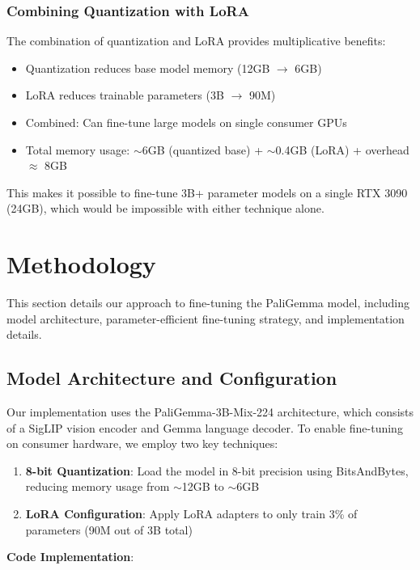 \documentclass[conference]{IEEEtran}
\begin{document}
\subsubsection{Combining Quantization with LoRA}

The combination of quantization and LoRA provides multiplicative benefits:

\begin{itemize}
    \item Quantization reduces base model memory (12GB $\rightarrow$ 6GB)
    \item LoRA reduces trainable parameters (3B $\rightarrow$ 90M)
    \item Combined: Can fine-tune large models on single consumer GPUs
    \item Total memory usage: $\sim$6GB (quantized base) + $\sim$0.4GB (LoRA) + overhead $\approx$ 8GB
\end{itemize}

This makes it possible to fine-tune 3B+ parameter models on a single RTX 3090 (24GB), which would be impossible with either technique alone.

\section{Methodology}

This section details our approach to fine-tuning the PaliGemma model, including model architecture, parameter-efficient fine-tuning strategy, and implementation details.

\subsection{Model Architecture and Configuration}

Our implementation uses the PaliGemma-3B-Mix-224 architecture, which consists of a SigLIP vision encoder and Gemma language decoder. To enable fine-tuning on consumer hardware, we employ two key techniques:

\begin{enumerate}
    \item \textbf{8-bit Quantization}: Load the model in 8-bit precision using BitsAndBytes, reducing memory usage from $\sim$12GB to $\sim$6GB
    \item \textbf{LoRA Configuration}: Apply LoRA adapters to only train 3\% of parameters (90M out of 3B total)
\end{enumerate}

\textbf{Code Implementation}:
\end{document}
